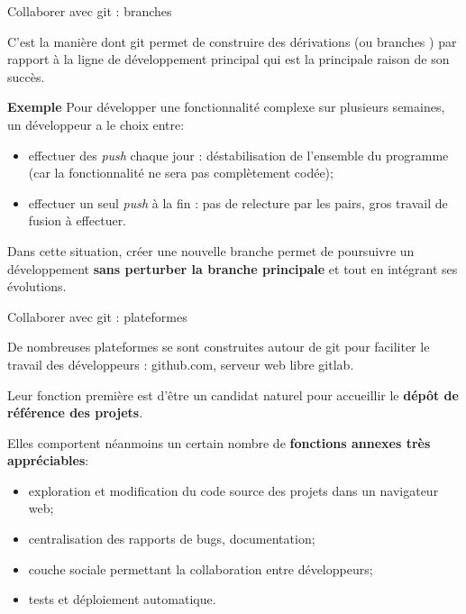 \documentclass[12pt,handout,ignorenonframetext,]{beamer}
\providecommand{\tightlist}{%
  \setlength{\itemsep}{0pt}\setlength{\parskip}{0pt}}
\newcommand{\intertitre}[1]{\textbf{\textcolor{redInsee}{#1}}}
\begin{document}
\begin{frame}{Collaborer avec git : branches}

C'est la manière dont git permet de construire des dérivations (ou
\og branches \fg{}) par rapport à la ligne de développement principal
qui est la principale raison de son succès.

\bigskip \pause \intertitre{Exemple} Pour développer une fonctionnalité
complexe sur plusieurs semaines, un développeur a le choix entre:

\begin{itemize}
\tightlist
\item
  \pause effectuer des \emph{push} chaque jour : déstabilisation de
  l'ensemble du programme (car la fonctionnalité ne sera pas
  complètement codée);
\item
  \pause effectuer un seul \emph{push} à la fin : pas de relecture par
  les pairs, gros travail de fusion à effectuer.
\end{itemize}

\bigskip \pause  Dans cette situation, créer une nouvelle branche permet
de poursuivre un développement \textbf{sans perturber la branche
principale} et tout en intégrant ses évolutions.

\end{frame}

\begin{frame}{Collaborer avec git : plateformes}

De nombreuses plateformes se sont construites autour de git pour
faciliter le travail des développeurs : github.com, serveur web libre
gitlab.

\bigskip \pause Leur fonction première est d'être un candidat naturel
pour accueillir le \textbf{dépôt de référence des projets}.

\bigskip \pause Elles comportent néanmoins un certain nombre de
\textbf{fonctions annexes très appréciables}:

\begin{itemize}
\tightlist
\item
  \pause exploration et modification du code source des projets dans un
  navigateur web;
\item
  \pause centralisation des rapports de bugs, documentation;
\item
  \pause couche sociale permettant la collaboration entre développeurs;
\item
  \pause tests et déploiement automatique.
\end{itemize}

\end{frame}
\end{document}
